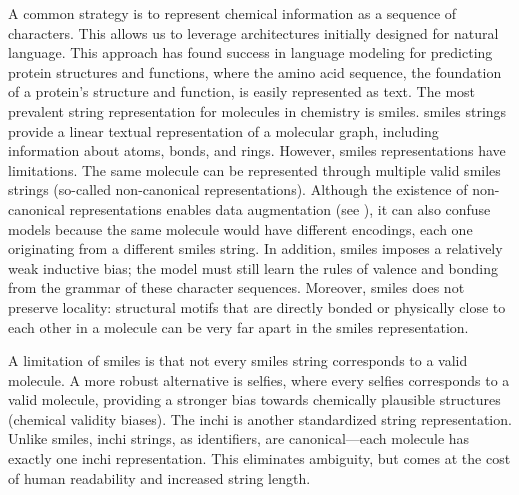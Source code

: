 
\label{tab:representation_table}

A common strategy is to represent chemical information as a sequence of characters. This allows us to leverage architectures initially designed for natural language. 
This approach has found success in language modeling for predicting protein structures and functions, where the amino acid sequence, the foundation of a protein's structure and function, is easily represented as text.\autocite{Rives_2021, Elnaggar_2022, Ruffolo_2024}
The most prevalent string representation for molecules in chemistry is \gls{smiles}\autocite{weininger1988smiles}.
\gls{smiles} strings provide a linear textual representation of a molecular graph, including information about atoms, bonds, and rings. 
However, \gls{smiles} representations have limitations. The same molecule can be represented through multiple valid \gls{smiles} strings (so-called non-canonical representations).
Although the existence of non-canonical representations enables data augmentation (see ), it can also confuse models because the same molecule would have different encodings, each one originating from a different \gls{smiles} string. 
In addition, \gls{smiles} imposes a relatively weak inductive bias; the model must still learn the rules of valence and bonding from the grammar of these character sequences. Moreover, \gls{smiles} does not preserve locality: structural motifs that are directly bonded or physically close to each other in a molecule can be very far apart in the \gls{smiles} representation.

A limitation of \gls{smiles} is that not every \gls{smiles} string corresponds to a valid molecule.
A more robust alternative is \gls{selfies}\autocite{krenn2020self,cheng2023group}, where every \gls{selfies} corresponds to a valid molecule, providing a stronger bias towards chemically plausible structures (chemical validity biases). 
The \gls{inchi} is another standardized string representation. 
Unlike \gls{smiles}, \gls{inchi} strings, as identifiers, are canonical---each molecule has exactly one \gls{inchi} representation.  
This eliminates ambiguity, but comes at the cost of human readability and increased string length. 

